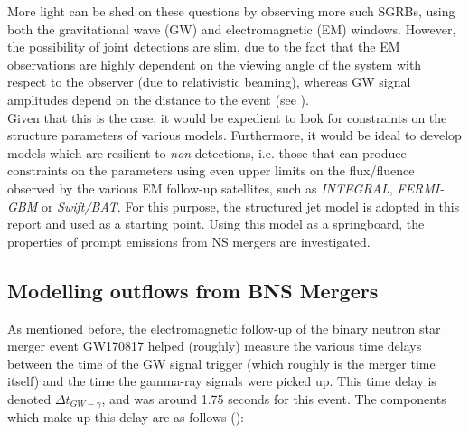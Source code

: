    More light can be shed on these questions by observing more such SGRBs, using both
    the gravitational wave (GW) and electromagnetic (EM) windows.  However, the
    possibility of joint detections are slim, due to the fact that the EM observations
    are highly dependent on the viewing angle of the system with respect to the observer
    (due to relativistic beaming), whereas GW signal amplitudes depend on the distance
    to the event (see \cite{seto_2015}).\\
    Given that this is the case, it would be expedient to look for constraints on the
    structure parameters of various models. Furthermore, it would be ideal to develop
    models which are resilient to \emph{non}-detections, i.e. those that can produce
    constraints on the parameters using even upper limits on the flux/fluence observed
    by the various EM follow-up satellites, such as \textit{INTEGRAL},
    \textit{FERMI-GBM} or \textit{Swift/BAT}.
    For this purpose, the structured jet model is adopted in this report and used as a
    starting point. Using this model as a springboard, the properties of prompt
    emissions from NS mergers are investigated.\\

    \subsection{Modelling outflows from BNS Mergers}\label{ssec:bns-outflows}

    As mentioned before, the electromagnetic follow-up of the binary neutron star merger
    event GW170817 helped (roughly) measure the various time delays between the time of
    the GW signal trigger (which roughly is the merger time itself) and the time the
    gamma-ray signals were picked up. This time delay is denoted $\Delta t_{GW-\gamma}$,
    and was around 1.75 seconds for this event.  The components which make up this delay
    are as follows (\cite{lazzati_2020}):

